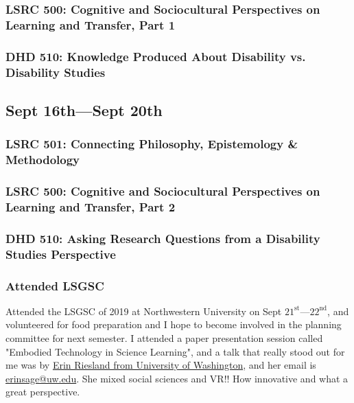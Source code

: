\documentclass{TC}
\begin{document}
	\subsubsection{LSRC 500: Cognitive and Sociocultural Perspectives on Learning and Transfer, Part 1}
	
	
	\subsubsection{DHD 510: Knowledge Produced About Disability vs. Disability Studies}
	


\subsection{Sept 16th---Sept 20th}
	\subsubsection{LSRC 501: Connecting Philosophy, Epistemology \& Methodology}
	

	\subsubsection{LSRC 500: Cognitive and Sociocultural Perspectives on Learning and Transfer, Part 2}
	

	\subsubsection{DHD 510: Asking Research Questions from a Disability Studies Perspective}
	

	\subsubsection{Attended \gls{LSGSC}}
	Attended the \gls{LSGSC} of 2019 at Northwestern University on Sept $21^{\text{st}}$---$22^{\text{nd}}$, and volunteered for food preparation and I hope to become involved in the planning committee for next semester. 
	I attended a paper presentation session called "Embodied Technology in Science Learning", and a talk that really stood out for me was by \href{https://www.education.uw.edu/technologycenter/about-us/meet-the-staff/}{Erin Riesland from University of Washington}, and her email is \href{mailto:erinsage@uw.edu}{erinsage@uw.edu}. She mixed social sciences and VR!! How innovative and what a great perspective.
	
\end{document}
